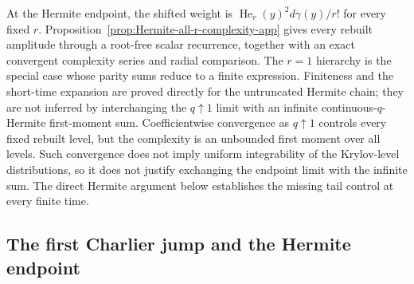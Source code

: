\documentclass[a4paper,11pt]{article}
\def\dd{d}%
\theoremstyle{definition}
\theoremstyle{remark}
\newcommand{\dd}{\mathrm d}
\newcommand{\He}{\operatorname{He}}
\begin{document}
At the Hermite endpoint, the shifted weight is $\He_r(y)^2\dd\gamma(y)/r!$ for every fixed
$r$.  Proposition~\ref{prop:Hermite-all-r-complexity-app} gives every rebuilt amplitude through a
root-free scalar recurrence, together with an exact convergent complexity series and radial
comparison.  The $r=1$ hierarchy is the special case whose parity sums reduce to a finite
expression.  Finiteness and the short-time expansion are proved directly for the untruncated
Hermite chain; they are not inferred by interchanging the $q\uparrow1$ limit with an infinite
continuous-$q$-Hermite first-moment sum.
Coefficientwise convergence as $q\uparrow1$ controls every fixed rebuilt level, but the
complexity is an unbounded first moment over all levels.  Such convergence does not imply uniform
integrability of the Krylov-level distributions, so it does not justify exchanging the endpoint
limit with the infinite sum.  The direct Hermite argument below establishes the missing tail
control at every finite time.

\subsection{The first Charlier jump and the Hermite endpoint}
\label{app:H1-first-jump}
\end{document}
